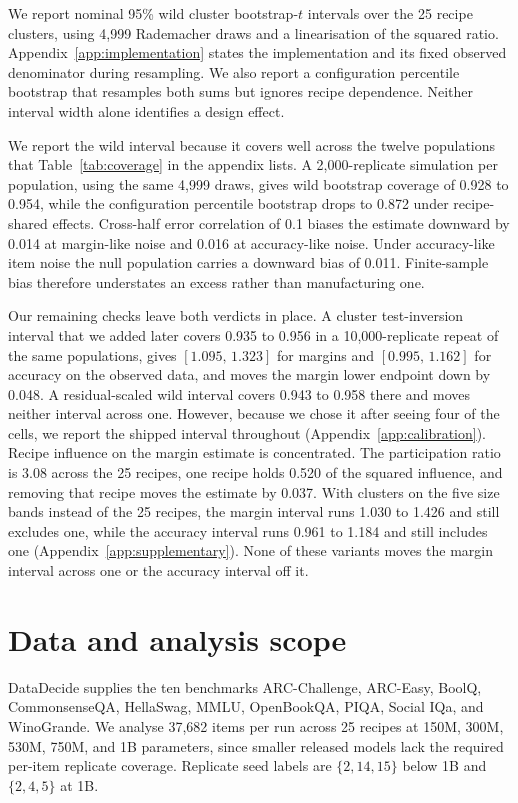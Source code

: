 \documentclass{article}
\newcommand{\ci}[2]{\ensuremath{[#1,\,#2]}}
\begin{document}
We report nominal 95\% wild cluster bootstrap-$t$ intervals over the 25 recipe clusters, using 4,999 Rademacher draws and a linearisation of the squared ratio. Appendix~\ref{app:implementation} states the implementation and its fixed observed denominator during resampling. We also report a configuration percentile bootstrap that resamples both sums but ignores recipe dependence. Neither interval width alone identifies a design effect.

We report the wild interval because it covers well across the twelve populations that Table~\ref{tab:coverage} in the appendix lists. A 2,000-replicate simulation per population, using the same 4,999 draws, gives wild bootstrap coverage of 0.928 to 0.954, while the configuration percentile bootstrap drops to 0.872 under recipe-shared effects. Cross-half error correlation of 0.1 biases the estimate downward by 0.014 at margin-like noise and 0.016 at accuracy-like noise. Under accuracy-like item noise the null population carries a downward bias of 0.011. Finite-sample bias therefore understates an excess rather than manufacturing one.

Our remaining checks leave both verdicts in place. A cluster test-inversion interval that we added later covers 0.935 to 0.956 in a 10,000-replicate repeat of the same populations, gives \ci{1.095}{1.323} for margins and \ci{0.995}{1.162} for accuracy on the observed data, and moves the margin lower endpoint down by 0.048. A residual-scaled wild interval covers 0.943 to 0.958 there and moves neither interval across one. However, because we chose it after seeing four of the cells, we report the shipped interval throughout (Appendix~\ref{app:calibration}). Recipe influence on the margin estimate is concentrated. The participation ratio is 3.08 across the 25 recipes, one recipe holds 0.520 of the squared influence, and removing that recipe moves the estimate by 0.037. With clusters on the five size bands instead of the 25 recipes, the margin interval runs 1.030 to 1.426 and still excludes one, while the accuracy interval runs 0.961 to 1.184 and still includes one (Appendix~\ref{app:supplementary}). None of these variants moves the margin interval across one or the accuracy interval off it.

\section{Data and analysis scope}
DataDecide supplies the ten benchmarks ARC-Challenge, ARC-Easy, BoolQ, CommonsenseQA, HellaSwag, MMLU, OpenBookQA, PIQA, Social IQa, and WinoGrande. We analyse 37,682 items per run across 25 recipes at 150M, 300M, 530M, 750M, and 1B parameters, since smaller released models lack the required per-item replicate coverage. Replicate seed labels are $\{2,14,15\}$ below 1B and $\{2,4,5\}$ at 1B.
\end{document}
